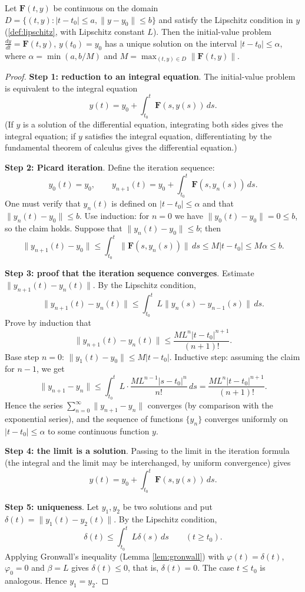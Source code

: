 \begin{theorem}\label{thm:picard_lindelof}
Let $\mathbf{F}(t, y)$ be continuous on the domain $D = \{(t, y) : |t-t_0| \le a, \|y - y_0\| \le b\}$ and satisfy the Lipschitz condition in $y$ (\cref{def:lipschitz}, with Lipschitz constant $L$). Then the initial-value problem $\frac{dy}{dt} = \mathbf{F}(t, y)$, $y(t_0) = y_0$ has a unique solution on the interval $|t-t_0| \le \alpha$, where $\alpha = \min(a, b/M)$ and $M = \max_{(t,y)\in D} \|\mathbf{F}(t,y)\|$.
\end{theorem}

\begin{proof}
\textbf{Step 1: reduction to an integral equation}. The initial-value problem is equivalent to the integral equation
\[
y(t) = y_0 + \int_{t_0}^t \mathbf{F}(s, y(s))\,ds.
\]
(If $y$ is a solution of the differential equation, integrating both sides gives the integral equation; if $y$ satisfies the integral equation, differentiating by the fundamental theorem of calculus gives the differential equation.)

\textbf{Step 2: Picard iteration}. Define the iteration sequence:
\[
y_0(t) = y_0, \qquad y_{n+1}(t) = y_0 + \int_{t_0}^t \mathbf{F}(s, y_n(s))\,ds.
\]
One must verify that $y_n(t)$ is defined on $|t-t_0| \le \alpha$ and that $\|y_n(t) - y_0\| \le b$. Use induction: for $n=0$ we have $\|y_0(t)-y_0\|=0\le b$, so the claim holds. Suppose that $\|y_n(t) - y_0\| \le b$; then
\[
\|y_{n+1}(t) - y_0\| \le \int_{t_0}^t \|\mathbf{F}(s, y_n(s))\|\,ds \le M |t - t_0| \le M\alpha \le b.
\]

\textbf{Step 3: proof that the iteration sequence converges}. Estimate $\|y_{n+1}(t) - y_n(t)\|$. By the Lipschitz condition,
\[
\|y_{n+1}(t) - y_n(t)\| \le \int_{t_0}^t L\|y_n(s) - y_{n-1}(s)\|\,ds.
\]
Prove by induction that
\[
\|y_{n+1}(t) - y_n(t)\| \le \frac{M L^n |t - t_0|^{n+1}}{(n+1)!}.
\]
Base step $n=0$: $\|y_1(t) - y_0\| \le M|t-t_0|$. Inductive step: assuming the claim for $n-1$, we get
\[
\|y_{n+1} - y_n\| \le \int_{t_0}^t L \cdot \frac{M L^{n-1} |s-t_0|^n}{n!}\,ds = \frac{M L^n |t-t_0|^{n+1}}{(n+1)!}.
\]
Hence the series $\sum_{n=0}^{\infty} \|y_{n+1} - y_n\|$ converges (by comparison with the exponential series), and the sequence of functions $\{y_n\}$ converges uniformly on $|t-t_0| \le \alpha$ to some continuous function $y$.

\textbf{Step 4: the limit is a solution}. Passing to the limit in the iteration formula (the integral and the limit may be interchanged, by uniform convergence) gives
\[
y(t) = y_0 + \int_{t_0}^t \mathbf{F}(s, y(s))\,ds.
\]

\textbf{Step 5: uniqueness}. Let $y_1, y_2$ be two solutions and put $\delta(t) = \|y_1(t) - y_2(t)\|$. By the Lipschitz condition,
\[
\delta(t) \le \int_{t_0}^t L\delta(s)\,ds \qquad (t \ge t_0).
\]
Applying Gronwall's inequality (Lemma \ref{lem:gronwall}) with $\varphi(t) = \delta(t)$, $\varphi_0 = 0$ and $\beta = L$ gives $\delta(t) \le 0$, that is, $\delta(t) = 0$. The case $t \le t_0$ is analogous. Hence $y_1 = y_2$.
\end{proof}


